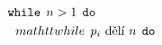 \documentclass[preview]{standalone}
\begin{document}
\begin{align*}
\mathtt{while} & \:\: n > 1 \:\:  \mathtt{do}  \\&\hspace*{-2em}mathtt{while} \:\: p_i \text{ dělí } n \:\:  \mathtt{do}
\end{align*}
\end{document}
